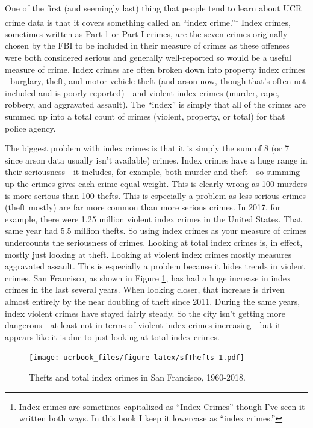 \documentclass[
  12pt,
  openany]{book}
\begin{document}
One of the first (and seemingly last) thing that people tend to learn about UCR crime data is that it covers something called an ``index crime.''\footnote{Index crimes are sometimes capitalized as ``Index Crimes'' though I've seen it written both ways. In this book I keep it lowercase as ``index crimes.''} Index crimes, sometimes written as Part 1 or Part I crimes, are the seven crimes originally chosen by the FBI to be included in their measure of crimes as these offenses were both considered serious and generally well-reported so would be a useful measure of crime. Index crimes are often broken down into property index crimes - burglary, theft, and motor vehicle theft (and arson now, though that's often not included and is poorly reported) - and violent index crimes (murder, rape, robbery, and aggravated assault). The ``index'' is simply that all of the crimes are summed up into a total count of crimes (violent, property, or total) for that police agency.

The biggest problem with index crimes is that it is simply the sum of 8 (or 7 since arson data usually isn't available) crimes. Index crimes have a huge range in their seriousness - it includes, for example, both murder and theft - so summing up the crimes gives each crime equal weight. This is clearly wrong as 100 murders is more serious than 100 thefts. This is especially a problem as less serious crimes (theft mostly) are far more common than more serious crimes. In 2017, for example, there were 1.25 million violent index crimes in the United States. That same year had 5.5 million thefts. So using index crimes as your measure of crimes undercounts the seriousness of crimes. Looking at total index crimes is, in effect, mostly just looking at theft. Looking at violent index crimes mostly measures aggravated assault. This is especially a problem because it hides trends in violent crimes. San Francisco, as shown in Figure \ref{fig:sfThefts}, has had a huge increase in index crimes in the last several years. When looking closer, that increase is driven almost entirely by the near doubling of theft since 2011. During the same years, index violent crimes have stayed fairly steady. So the city isn't getting more dangerous - at least not in terms of violent index crimes increasing - but it appears like it is due to just looking at total index crimes.

\begin{figure}
\centering
\texttt{[image: ucrbook\_files/figure-latex/sfThefts-1.pdf]}
\caption{\label{fig:sfThefts}Thefts and total index crimes in San Francisco, 1960-2018.}
\end{figure}
\end{document}
